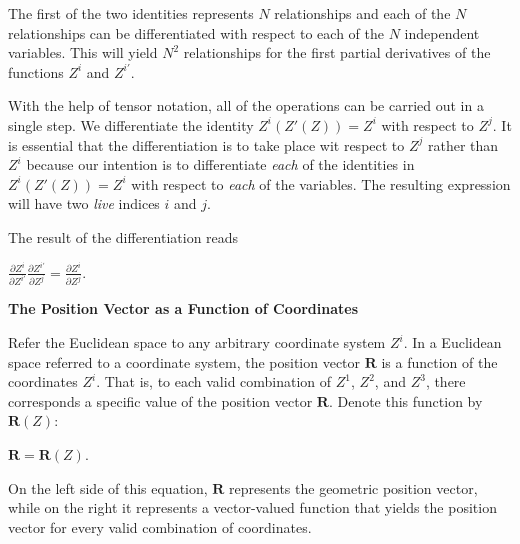 \documentclass[12pt, a4paper]{article}
\begin{document}
    The first of the two identities represents $N$ relationships and each of the $N$ relationships can be differentiated with respect to each of the $N$ independent variables. This will yield $N^2$ relationships for the first partial derivatives of the functions $Z^i$ and $Z^{i'}$.\par
    
    With the help of tensor notation, all of the operations can be carried out in a single step. We differentiate the identity $Z^i(Z'(Z))=Z^i$ with respect to $Z^j$. It is essential that the differentiation is to take place wit respect to $Z^j$ rather than $Z^i$ because our intention is to differentiate \textit{each} of the identities in $Z^i(Z'(Z))=Z^i$ with respect to \textit{each} of the variables. The resulting expression will have two \textit{live} indices $i$ and $j$.\par
    
    The result of the differentiation reads\par
    
\vspace{8mm}

        \centerline{\Large{$\frac{\partial Z^i}{\partial Z^{i'}}\frac{\partial Z^{i'}}{\partial Z^j}=\frac{\partial Z^i}{\partial Z^j}$}.}
        
\vspace{8mm}

\begin{flushleft}

    \textbf{The Position Vector as a Function of Coordinates}

\end{flushleft}

    Refer the Euclidean space to any arbitrary coordinate system $Z^i$. In a Euclidean space referred to a coordinate system, the position vector $\mathbf{R}$ is a function of the coordinates $Z^i$. That is, to each valid combination of $Z^1$, $Z^2$, and $Z^3$, there corresponds a specific value of the position vector $\mathbf{R}$. Denote this function by $\mathbf{R}(Z)$:\par

\vspace{4mm}

    \centerline{$\mathbf{R}=\mathbf{R}(Z)$.}
    
\vspace{4mm}

    On the left side of this equation, $\mathbf{R}$ represents the geometric position vector, while on the right it represents a vector-valued function that yields the position vector for every valid combination of coordinates.\par
    
\end{document}
